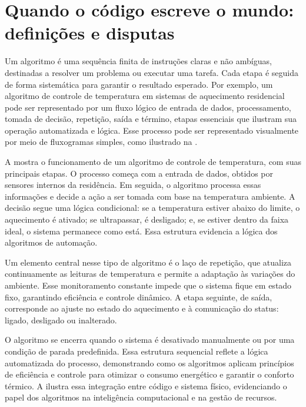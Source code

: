 \documentclass[portuguese]{textolivre}
\begin{document}
\section{Quando o código escreve o mundo: definições e disputas}\label{sec-normas}
Um algoritmo é uma sequência finita de instruções claras e não ambíguas, destinadas a resolver um problema ou executar uma tarefa. Cada etapa é seguida de forma sistemática para garantir o resultado esperado. Por exemplo, um algoritmo de controle de temperatura em sistemas de aquecimento residencial pode ser representado por um fluxo lógico de entrada de dados, processamento, tomada de decisão, repetição, saída e término, etapas essenciais que ilustram sua operação automatizada e lógica. Esse processo pode ser representado visualmente por meio de fluxogramas simples, como ilustrado na .

A  mostra o funcionamento de um algoritmo de controle de temperatura, com suas principais etapas. O processo começa com a entrada de dados, obtidos por sensores internos da residência. Em seguida, o algoritmo processa essas informações e decide a ação a ser tomada com base na temperatura ambiente. A decisão segue uma lógica condicional: se a temperatura estiver abaixo do limite, o aquecimento é ativado; se ultrapassar, é desligado; e, se estiver dentro da faixa ideal, o sistema permanece como está. Essa estrutura evidencia a lógica dos algoritmos de automação.

Um elemento central nesse tipo de algoritmo é o laço de repetição, que atualiza continuamente as leituras de temperatura e permite a adaptação às variações do ambiente. Esse monitoramento constante impede que o sistema fique em estado fixo, garantindo eficiência e controle dinâmico. A etapa seguinte, de saída, corresponde ao ajuste no estado do aquecimento e à comunicação do status: ligado, desligado ou inalterado.

O algoritmo se encerra quando o sistema é desativado manualmente ou por uma condição de parada predefinida. Essa estrutura sequencial reflete a lógica automatizada do processo, demonstrando como os algoritmos aplicam princípios de eficiência e controle para otimizar o consumo energético e garantir o conforto térmico. A  ilustra essa integração entre código e sistema físico, evidenciando o papel dos algoritmos na inteligência computacional e na gestão de recursos.
\end{document}
